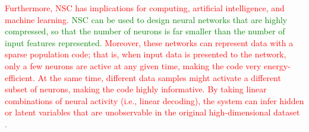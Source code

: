\textcolor{red} {Furthermore, NSC has implications for computing, artificial intelligence, and machine learning.} \textcolor{green}{\ac{NSC} can be used to design neural networks that are highly compressed, so that the number of neurons is far smaller than the number of input features represented.} \textcolor{red}{Moreover, these networks can represent data with a sparse population code; that is, when input data is presented to the network, only a few neurons are active at any given time, making the code very energy-efficient. At the same time, different data samples might activate a different subset of neurons, making the code highly informative. By taking linear combinations of neural activity (i.e., linear decoding), the system can infer hidden or latent variables that are unobservable in the original high-dimensional dataset} \textcolor{green}{\citep{PougetSnyder2000}.} 
%


